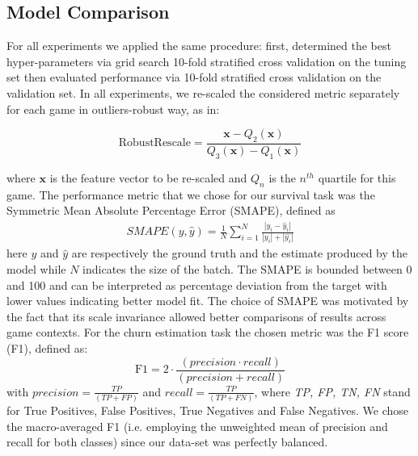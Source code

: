 \subsection{Model Comparison}
For all experiments we applied the same procedure: first, determined the best hyper-parameters via grid search 10-fold stratified cross validation \cite{scikit-learn} on the tuning set then evaluated performance via 10-fold stratified cross validation on the validation set. In all experiments, we re-scaled the considered metric separately for each game in outliers-robust way, as in:

\begin{equation}
\label{robustscaler}
    \text{RobustRescale}=
        \dfrac
            {\mathbf{x} - Q_2(\mathbf{x})}
            {Q_3(\mathbf{x}) - Q_1(\mathbf{x})}
\end{equation}

where $\mathbf{x}$ is the feature vector to be re-scaled and $Q_n$ is the $n^{th}$ quartile for this game. The performance metric that we chose for our survival task was the Symmetric Mean Absolute Percentage Error (SMAPE), defined as
\begin{equation}
  \begin{gathered} 
  \label{smape}
     SMAPE(y, \widehat{y}) = 
    \frac{1}{N} 
    \sum_{i=1}^{N}
    \frac{| y_{i} - \widehat{y}_{i} |} {|y_{i}| + |\widehat{y_{i}}|}  
  \end{gathered}
\end{equation}
here $y$ and $\widehat{y}$ are respectively the ground truth and the estimate produced by the model while $N$ indicates the size of the batch. The SMAPE is bounded between 0 and 100 and can be interpreted as percentage deviation from the target with lower values indicating better model fit. The choice of SMAPE was motivated by the fact that its scale invariance allowed better comparisons of results across game contexts. For the churn estimation task the chosen metric was the F1 score (F1), defined as:
\begin{equation}
\label{f1}
    \text{F1}=
        2 \cdot 
        \dfrac
            {(precision \cdot recall)}
            {(precision + recall)}
\end{equation}
with $precision =\frac {TP}{(TP + FP)}$ and $recall = \frac {TP}{(TP + FN)}$, where \textit{TP, FP, TN, FN} stand for True Positives, False Positives, True Negatives and False Negatives. We chose the macro-averaged F1 (i.e. employing the unweighted mean of precision and recall for both classes) since our data-set was perfectly balanced.

